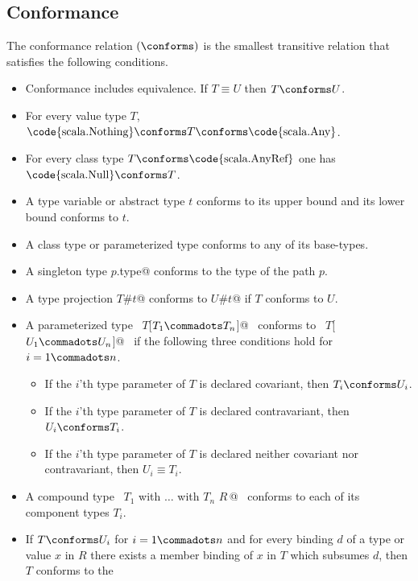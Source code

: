 \subsection{Conformance}
\label{sec:conformance}

The conformance relation $(\conforms)$ is the smallest 
transitive relation that satisfies the following conditions.
\begin{itemize}
\item Conformance includes equivalence. If $T \equiv U$ then $T \conforms U$.
\item For every value type $T$, 
      $\mbox{\code{scala.Nothing}} \conforms T \conforms \mbox{\code{scala.Any}}$. 
\item For every class type $T \conforms \mbox{\code{scala.AnyRef}}$ 
      one has $\mbox{\code{scala.Null}} \conforms T$.
\item A type variable or abstract type $t$ conforms to its upper bound and
      its lower bound conforms to $t$. 
\item A class type or parameterized type conforms to any of its
  base-types.
\item A singleton type \lstinline@$p$.type@ conforms to the type of
  the path $p$.
\item A type projection \lstinline@$T$#$t$@ conforms to \lstinline@$U$#$t$@ if 
      $T$ conforms to $U$.
\item A parameterized type ~\lstinline@$T$[$T_1 \commadots T_n$]@~ conforms to 
      ~\lstinline@$T$[$U_1 \commadots U_n$]@~ if
      the following three conditions hold for $i = 1 \commadots n$. 
      \begin{itemize}
      \item
      If the $i$'th type parameter of $T$ is declared covariant, then $T_i \conforms U_i$.
      \item
      If the $i$'th type parameter of $T$ is declared contravariant, then $U_i \conforms T_i$.
      \item
      If the $i$'th type parameter of $T$ is declared neither covariant 
      nor contravariant, then $U_i \equiv T_i$.
      \end{itemize}
\item A compound type ~\lstinline@$T_1$ with $\ldots$ with $T_n$ {$R\,$}@~ conforms to
      each of its component types $T_i$.
\item If $T \conforms U_i$ for $i = 1 \commadots n$ and for every
      binding $d$ of a type or value $x$ in $R$ there exists a member
      binding of $x$ in $T$ which subsumes $d$, then $T$ conforms to the

\end{itemize}
